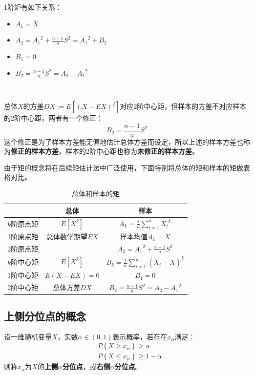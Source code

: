 1阶矩有如下关系：
\begin{itemize}
    \item $A_1=\bar{X}$
    \item $A_2={A_1}^2+\frac{n-1}{n}S^2={A_1}^2+B_2$
    \item $B_1=0$
    \item $B_2=\frac{n-1}{n}S^2=A_2-{A_1}^2$
\end{itemize}

~

总体$X$的方差$DX:=E\left[ \left( X-EX \right) ^2 \right] $对应2阶中心距，但样本的方差不对应样本的2阶中心距，两者有一个修正：
\[
B_2=\frac{n-1}{n}S^2
\]
这个修正是为了样本方差能无偏地估计总体方差而设定，所以上述的样本方差也称为{\bf 修正的样本方差}，样本的2阶中心距也称为{\bf 未修正的样本方差}。

由于矩的概念将在后续矩估计法中广泛使用，下面特别将总体的矩和样本的矩做表格对比。

\begin{table}[h]
\centering
\caption{总体和样本的矩}
\begin{tabular}{ccc}
    \toprule
    & 总体 & 样本\\
    \midrule
    $k$阶原点矩 & $E\left[ X^k \right] $ & $A_k=\frac{1}{n}\sum_{i=1}^n{{X_i}^k}$\\
    1阶原点矩 & 总体数学期望$EX$ & 样本均值$A_1=\bar{X}$\\
    2阶原点矩 & & $A_2={A_1}^2+\frac{n-1}{n}S^2$\\
    $k$阶中心矩 & $E\left[ X^k \right] $ & $B_k=\frac{1}{n}\sum_{i=1}^n{\left( X_i-\bar{X} \right) ^k}$\\
    1阶中心矩 & $E\left( X-EX \right) =0$ & $B_1=0$\\
    2阶中心矩 & 总体方差$DX$ & $B_2=\frac{n-1}{n}S^2=A_2-{A_1}^2$\\
    \bottomrule
\end{tabular}
\end{table}

\subsection{上侧分位点的概念}

\begin{definition}[上侧分位点]
设一维随机变量$X$，实数$\alpha \in \left( 0,1 \right) $表示概率，若存在$x_{\alpha}$满足：
\begin{align*}
&P\left\{ X\geqslant x_{\alpha} \right\} \geqslant \alpha \\
&P\left\{ X\leqslant x_{\alpha} \right\} \geqslant 1-\alpha
\end{align*}
则称$x_{\alpha}$为$X$的{\bf 上侧$\alpha $分位点}，或{\bf 右侧$\alpha $分位点}。
\end{definition}

